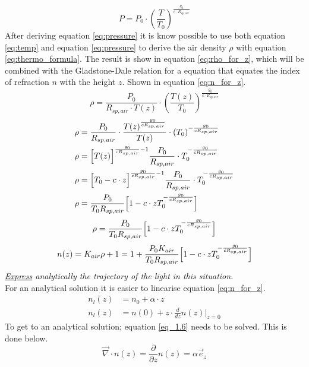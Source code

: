\documentclass{article}
\begin{document}
\begin{equation}
	P = P_0 \cdot (\frac{T}{T_0})^{\frac{g_0}{c\cdot R_{sp,air}}}
	\label{eq:pressure}
\end{equation}
After deriving equation \ref{eq:pressure} it is know possible to use both equation \ref{eq:temp} and equation \ref{eq:pressure} to derive the air density $\rho$ with equation \ref{eq:thermo_formula}. The result is show in equation \ref{eq:rho_for_z}, which will be combined with the Gladstone-Dale relation for a equation that equates the index of refraction $n$ with the height $z$. Shown in equation \ref{eq:n_for_z}.\\
\begin{equation*}
	\rho = \frac{P_0}{R_{sp,air}\cdot T(z)} \cdot(\frac{T(z)}{T_0})^{\frac{g_0}{c\cdot R_{sp,air}}}
\end{equation*}
\begin{align*}
	\rho &= \frac{P_0}{R_{sp,air}} \cdot \frac{T(z)^{\frac{g_0}{c R_{sp,air}}}}{T(z)} \cdot (T_0)^{-\frac{g_0}{c R_{sp,air}}}\\
	\rho &= \Bigl[T(z) \Bigr]^{\frac{g_0}{c R_{sp,air}} -1} \frac{P_0}{R_{sp,air}} \cdot T_0^{-\frac{g_0}{c R_{sp,air}}}\\
	\rho &= \Bigl[T_0 -c\cdot z \Bigr]^{\frac{g_0}{c R_{sp,air}} -1} \frac{P_0}{R_{sp,air}} \cdot T_0^{-\frac{g_0}{c R_{sp,air}}}\\
	\rho &= \frac{P_0}{T_0 R_{sp,air}} \Bigl[1-c\cdot z T_0^{-\frac{g_0}{c R_{sp,air}}}\Bigr]
\end{align*}
\begin{equation}
	\rho = \frac{P_0}{T_0 R_{sp,air}} \Bigl[1-c\cdot z T_0^{-\frac{g_0}{c R_{sp,air}}}\Bigr]
	\label{eq:rho_for_z}
\end{equation}
\begin{equation}
	n(z) = K_{air}\rho + 1 = 1 + \frac{P_0 K_{air}}{T_0 R_{sp,air}} \Bigl[1-c\cdot z T_0^{-\frac{g_0}{c R_{sp,air}}}\Bigr]
	\label{eq:n_for_z}
\end{equation}
\textit{\underline{Express} analytically the trajectory of the light in this situation.}\\
For an analytical solution it is easier to linearise equation \ref{eq:n_for_z}.
\begin{align*}
	n_l(z) &= n_0 + \alpha \cdot z\\
	n_l(z) &= n(0) +z \cdot \frac{d}{dz}n(z)\rvert_{z=0}
\end{align*}
To get to an analytical solution; equation \ref{eq_1.6} needs to be solved. This is done below.
\begin{equation*}
	\vec{\nabla} \cdot n(z) = \frac{\partial}{\partial z}n(z)= \alpha \vec{e}_z
\end{equation*}
\end{document}

